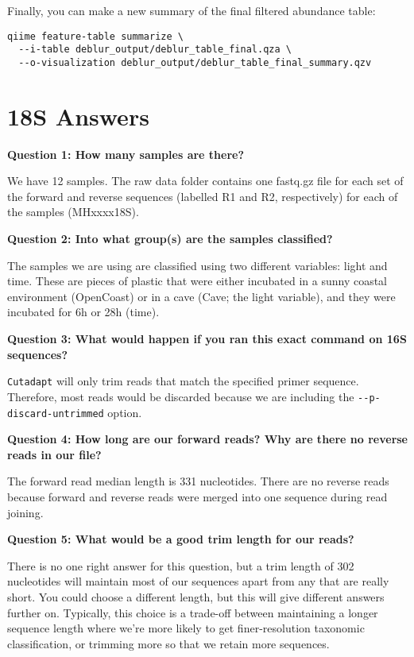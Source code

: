 \documentclass[
]{book}
\begin{document}
Finally, you can make a new summary of the final filtered abundance table:

\begin{verbatim}
qiime feature-table summarize \
  --i-table deblur_output/deblur_table_final.qza \
  --o-visualization deblur_output/deblur_table_final_summary.qzv
\end{verbatim}

\section{18S Answers}\label{s-answers-1}

\textbf{Question 1: How many samples are there?}

We have 12 samples. The raw data folder contains one fastq.gz file for each set of the forward and reverse sequences (labelled R1 and R2, respectively) for each of the samples (MHxxxx18S).

\textbf{Question 2: Into what group(s) are the samples classified?}

The samples we are using are classified using two different variables: light and time. These are pieces of plastic that were either incubated in a sunny coastal environment (OpenCoast) or in a cave (Cave; the light variable), and they were incubated for 6h or 28h (time).

\textbf{Question 3: What would happen if you ran this exact command on 16S sequences?}

\texttt{Cutadapt} will only trim reads that match the specified primer sequence. Therefore, most reads would be discarded because we are including the \texttt{-\/-p-discard-untrimmed} option.

\textbf{Question 4: How long are our forward reads? Why are there no reverse reads in our file?}

The forward read median length is 331 nucleotides. There are no reverse reads because forward and reverse reads were merged into one sequence during read joining.

\textbf{Question 5: What would be a good trim length for our reads?}

There is no one right answer for this question, but a trim length of 302 nucleotides will maintain most of our sequences apart from any that are really short. You could choose a different length, but this will give different answers further on. Typically, this choice is a trade-off between maintaining a longer sequence length where we're more likely to get finer-resolution taxonomic classification, or trimming more so that we retain more sequences.
\end{document}
